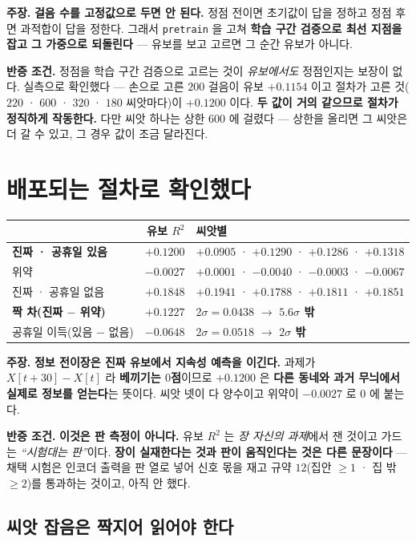 \documentclass[10pt,a4paper]{article}
\newcommand{\claim}[2]{\begin{claimbox}\textbf{주장.} #1\par\smallskip
  \textcolor{gray!70}{\textbf{반증 조건.} #2}\end{claimbox}}
\begin{document}
\claim{\textbf{걸음 수를 고정값으로 두면 안 된다.} 정점 전이면 초기값이 답을
정하고 정점 후면 과적합이 답을 정한다. 그래서 \texttt{pretrain} 을 고쳐
\textbf{학습 구간 검증으로 최선 지점을 잡고 그 가중으로 되돌린다} --- 유보를 보고
고르면 그 순간 유보가 아니다.}
{정점을 학습 구간 검증으로 고르는 것이 \emph{유보에서도} 정점인지는 보장이 없다.
실측으로 확인했다 --- 손으로 고른 $200$ 걸음이 유보 $+0.1154$ 이고 절차가 고른
것($220$ · $600$ · $320$ · $180$ 씨앗마다)이 \textbf{$+0.1200$} 이다. \textbf{두
값이 거의 같으므로 절차가 정직하게 작동한다.} 다만 씨앗 하나는 상한 $600$ 에
걸렸다 --- 상한을 올리면 그 씨앗은 더 갈 수 있고, 그 경우 값이 조금 달라진다.}

\section{배포되는 절차로 확인했다}

\begin{center}
\begin{tabular}{lrl}
\toprule
& 유보 $R^2$ & 씨앗별 \\
\midrule
\textbf{진짜 · 공휴일 있음} & $\mathbf{+0.1200}$ & $+0.0905$ · $+0.1290$ · $+0.1286$ · $+0.1318$ \\
위약 & $-0.0027$ & $+0.0001$ · $-0.0040$ · $-0.0003$ · $-0.0067$ \\
진짜 · 공휴일 없음 & $+0.1848$ & $+0.1941$ · $+0.1788$ · $+0.1811$ · $+0.1851$ \\
\midrule
\textbf{짝 차(진짜 $-$ 위약)} & $\mathbf{+0.1227}$ & $2\sigma = 0.0438$ $\to$ \textbf{$5.6\sigma$ 밖} \\
공휴일 이득(있음 $-$ 없음) & $-0.0648$ & $2\sigma = 0.0518$ $\to$ \textbf{$2\sigma$ 밖} \\
\bottomrule
\end{tabular}
\end{center}

\claim{\textbf{정보 전이장은 진짜 유보에서 지속성 예측을 이긴다.} 과제가
$X[t{+}30] - X[t]$ 라 \textbf{베끼기는 $0$점}이므로 $+0.1200$ 은 \textbf{다른 동네와
과거 무늬에서 실제로 정보를 얻는다}는 뜻이다. 씨앗 넷이 다 양수이고 위약이
$-0.0027$ 로 $0$ 에 붙는다.}
{\textbf{이것은 판 측정이 아니다.} 유보 $R^2$ 는 \emph{장 자신의 과제}에서 잰
것이고 가드는 \emph{``시험대는 판''}이다. \textbf{장이 실재한다는 것과 판이
움직인다는 것은 다른 문장이다} --- 채택 시험은 인코더 출력을 판 열로 넣어 신호
몫을 재고 규약 $12$(집안 $\geq 1$ · 집 밖 $\geq 2$)를 통과하는 것이고, 아직 안 했다.}

\subsection*{씨앗 잡음은 짝지어 읽어야 한다}
\end{document}
